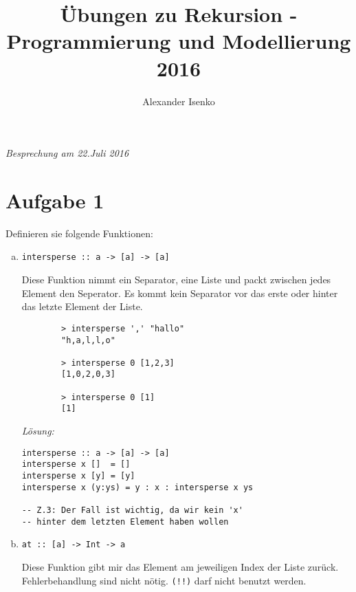 \documentclass{article}
\title{Übungen zu Rekursion - Programmierung und Modellierung 2016}
\author{Alexander Isenko}
\begin{document}
\maketitle

\begin{center}
\textit{Besprechung am 22.Juli 2016}
\end{center}

\section*{Aufgabe 1}
Definieren sie folgende Funktionen:
\begin{enumerate} [a)]
    \item \begin{verbatim}
intersperse :: a -> [a] -> [a]
          \end{verbatim}
    Diese Funktion nimmt ein Separator, eine Liste und packt zwischen jedes Element den Seperator. Es kommt kein Separator vor das erste oder hinter das letzte Element der Liste.
    
    \begin{verbatim}
        > intersperse ',' "hallo"
        "h,a,l,l,o"
        
        > intersperse 0 [1,2,3]
        [1,0,2,0,3]
        
        > intersperse 0 [1]
        [1]
    \end{verbatim}

    \textit{Lösung:}
    \begin{mdframed}[backgroundcolor=bg]
        \begin{verbatim}
intersperse :: a -> [a] -> [a]
intersperse x []  = []
intersperse x [y] = [y]
intersperse x (y:ys) = y : x : intersperse x ys

-- Z.3: Der Fall ist wichtig, da wir kein 'x'
-- hinter dem letzten Element haben wollen
        \end{verbatim}
    \end{mdframed}

\newpage

    \item \begin{verbatim}
at :: [a] -> Int -> a
          \end{verbatim}
    Diese Funktion gibt mir das Element am jeweiligen Index der Liste zurück. \\
    Fehlerbehandlung sind nicht nötig. \texttt{(!!)} darf nicht benutzt werden. \\


\end{enumerate}
\end{document}
